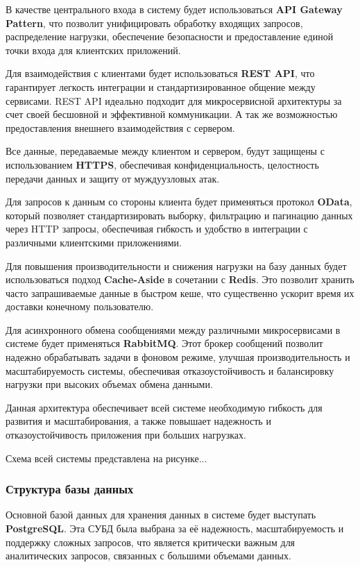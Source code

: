 В качестве центрального входа в систему будет использоваться \textbf{API Gateway Pattern}, что позволит унифицировать обработку входящих запросов, распределение нагрузки, обеспечение безопасности и предоставление единой точки входа для клиентских приложений.

Для взаимодействия с клиентами будет использоваться \textbf{REST API}, что гарантирует легкость интеграции и стандартизированное общение между сервисами. REST API идеально подходит для микросервисной архитектуры за счет своей бесшовной и эффективной коммуникации. А так же возможностью предоставления внешнего взаимодействия с сервером.

Все данные, передаваемые между клиентом и сервером, будут защищены с использованием \textbf{HTTPS}, обеспечивая конфиденциальность, целостность передачи данных и защиту от муждуузловых атак.

Для запросов к данным со стороны клиента будет применяться протокол \textbf{OData}, который позволяет стандартизировать выборку, фильтрацию и пагинацию данных через HTTP запросы, обеспечивая гибкость и удобство в интеграции с различными клиентскими приложениями.

Для повышения производительности и снижения нагрузки на базу данных будет использоваться подход \textbf{Cache-Aside} в сочетании с \textbf{Redis}. Это позволит хранить часто запрашиваемые данные в быстром кеше, что существенно ускорит время их доставки конечному пользователю.

Для асинхронного обмена сообщениями между различными микросервисами в системе будет применяться \textbf{RabbitMQ}. Этот брокер сообщений позволит надежно обрабатывать задачи в фоновом режиме, улучшая производительность и масштабируемость системы, обеспечивая отказоустойчивость и балансировку нагрузки при высоких объемах обмена данными.

Данная архитектура обеспечивает всей системе необходимую гибкость для развития и масштабирования, а также повышает надежность и отказоустойчивость приложения при больших нагрузках.

Схема всей системы представлена на рисунке...

\subsubsection{Структура базы данных}

Основной базой данных для хранения данных в системе будет выступать \textbf{PostgreSQL}. Эта СУБД была выбрана за её надежность, масштабируемость и поддержку сложных запросов, что является критически важным для аналитических запросов, связанных с большими объемами данных.

